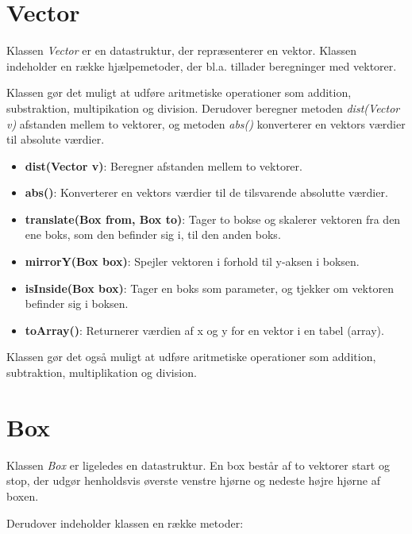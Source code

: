 \section{Vector}

Klassen \emph{Vector} er en datastruktur, der repræsenterer en vektor. Klassen indeholder en række hjælpemetoder, der bl.a. tillader beregninger med vektorer.

Klassen gør det muligt at udføre aritmetiske operationer som addition, substraktion, multipikation og division. Derudover beregner metoden \emph{dist(Vector v)} afstanden mellem to vektorer, og metoden \emph{abs()} konverterer en vektors værdier til absolute værdier.

\begin{itemize}
	\item \textbf{dist(Vector v)}: Beregner afstanden mellem to vektorer.
	\item \textbf{abs()}: Konverterer en vektors værdier til de tilsvarende absolutte værdier.
	\item \textbf{translate(Box from, Box to)}: Tager to bokse og skalerer vektoren fra den ene boks, som den befinder sig i, til den anden boks.
	\item \textbf{mirrorY(Box box)}: Spejler vektoren i forhold til y-aksen i boksen.
	\item \textbf{isInside(Box box)}: Tager en boks som parameter, og tjekker om vektoren befinder sig i boksen.
	\item \textbf{toArray()}: Returnerer værdien af x og y for en vektor i en tabel (array).
\end{itemize}

Klassen gør det også muligt at udføre aritmetiske operationer som addition, subtraktion, multiplikation og division. 

\section{Box}

Klassen \emph{Box} er ligeledes en datastruktur. En box består af to vektorer start og stop, der udgør henholdsvis øverste venstre hjørne og nedeste højre hjørne af boxen.

Derudover indeholder klassen en række metoder:

